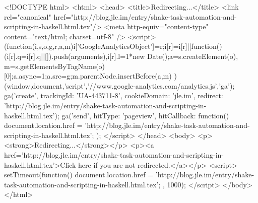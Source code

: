 <!DOCTYPE html>
<html>
<head>
<title>Redirecting...</title>
<link rel="canonical" href="http://blog.jle.im/entry/shake-task-automation-and-scripting-in-haskell.html.tex"/>
<meta http-equiv="content-type" content="text/html; charset=utf-8" />
<script>
(function(i,s,o,g,r,a,m){i['GoogleAnalyticsObject']=r;i[r]=i[r]||function(){
(i[r].q=i[r].q||[]).push(arguments)},i[r].l=1*new Date();a=s.createElement(o),
m=s.getElementsByTagName(o)[0];a.async=1;a.src=g;m.parentNode.insertBefore(a,m)
})(window,document,'script','//www.google-analytics.com/analytics.js','ga');
ga('create', { trackingId: 'UA-443711-8', cookieDomain: 'jle.im', redirect: 'http://blog.jle.im/entry/shake-task-automation-and-scripting-in-haskell.html.tex'});
ga('send', { hitType: 'pageview', hitCallback: function() { document.location.href = 'http://blog.jle.im/entry/shake-task-automation-and-scripting-in-haskell.html.tex'; } });
</script>
</head>
<body>
  <p><strong>Redirecting...</strong></p>
  <p><a href='http://blog.jle.im/entry/shake-task-automation-and-scripting-in-haskell.html.tex'>Click here if you are not redirected.</a></p>
  <script>
    setTimeout(function() { document.location.href = 'http://blog.jle.im/entry/shake-task-automation-and-scripting-in-haskell.html.tex'; }, 1000);
  </script>
</body>
</html>
